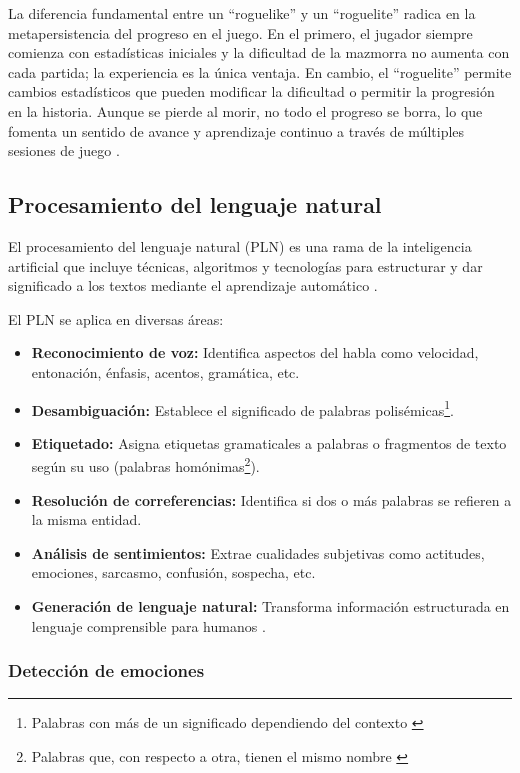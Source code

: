 \documentclass[12pt,twoside]{article}
\begin{document}
	La diferencia fundamental entre un ``roguelike'' y un ``roguelite'' radica en la metapersistencia del progreso en el juego. En el primero, el jugador siempre comienza con estadísticas iniciales y la dificultad de la mazmorra no aumenta con cada partida; la experiencia es la única ventaja. En cambio, el ``roguelite'' permite cambios estadísticos que pueden modificar la dificultad o permitir la progresión en la historia. Aunque se pierde al morir, no todo el progreso se borra, lo que fomenta un sentido de avance y aprendizaje continuo a través de múltiples sesiones de juego \cite{info: videojuego2}.
	
	\subsection{Procesamiento del lenguaje natural}
	
	El procesamiento del lenguaje natural (PLN) es una rama de la inteligencia artificial que incluye técnicas, algoritmos y tecnologías para estructurar y dar significado a los textos mediante el aprendizaje automático \cite{info: pln1}.
	
	El PLN se aplica en diversas áreas:
	\begin{itemize}[noitemsep]
		\item \textbf{Reconocimiento de voz:} Identifica aspectos del habla como velocidad, entonación, énfasis, acentos, gramática, etc.
		\item \textbf{Desambiguación:} Establece el significado de palabras polisémicas\footnote{Palabras con más de un significado dependiendo del contexto \cite{info: def: polisemica}}.
		\item \textbf{Etiquetado:} Asigna etiquetas gramaticales a palabras o fragmentos de texto según su uso (palabras homónimas\footnote{Palabras que, con respecto a otra, tienen el mismo nombre \cite{info: def: homonimo}}).
		\item \textbf{Resolución de correferencias:} Identifica si dos o más palabras se refieren a la misma entidad.
		\item \textbf{Análisis de sentimientos:} Extrae cualidades subjetivas como actitudes, emociones, sarcasmo, confusión, sospecha, etc.
		\item \textbf{Generación de lenguaje natural:} Transforma información estructurada en lenguaje comprensible para humanos \cite{info: pln2}.
	\end{itemize}
	
	\subsubsection{Detección de emociones}
	
\end{document}

